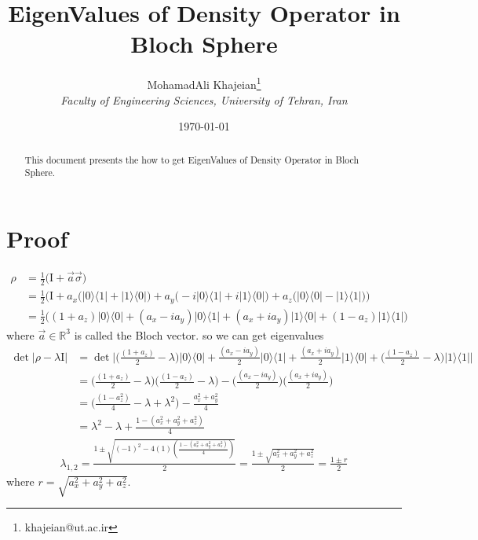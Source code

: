 \documentclass{article}
\title{\textbf{EigenValues of Density Operator in Bloch Sphere}}
\author{
    MohamadAli Khajeian\footnote{khajeian@ut.ac.ir} \\ 
    \small \textit{Faculty of Engineering Sciences, University of Tehran, Iran} \\ 
}
\date{\today}
\newcommand{\op}[2]{|#1\rangle \langle#2|}
\begin{document}
\maketitle

\begin{abstract}
    This document presents the how to get EigenValues of Density Operator in Bloch Sphere.
\end{abstract}

\section*{Proof}
\begin{align*}
    \rho &= \frac{1}{2}\big(\text{I} + \vec{a}\vec{\sigma}\big) \\
    &= \frac{1}{2}\bigg(\text{I} + a_{x}\big(\op{0}{1}+\op{1}{0}\big) + a_{y}\big(-i\op{0}{1}+i\op{1}{0}\big) + a_{z}\big(\op{0}{0}-\op{1}{1}\big)\bigg)\\
    &= \frac{1}{2}\bigg((1+a_{z})\op{0}{0}+(a_{x}-ia_{y})\op{0}{1}+(a_{x}+ia_{y})\op{1}{0}+(1-a_{z})\op{1}{1}\bigg)
\end{align*}
where ${\displaystyle {\vec {a}}\in \mathbb{R} ^{3}} $ is called the Bloch vector. so we can get eigenvalues
\begin{align*}
    \det |\rho - \lambda\text{I}| &= \det \bigg|\big(\frac{(1+a_{z})}{2}-\lambda\big)\op{0}{0}+\frac{(a_{x}-ia_{y})}{2}\op{0}{1}+\frac{(a_{x}+ia_{y})}{2}\op{1}{0}+\big(\frac{(1-a_{z})}{2}-\lambda\big)\op{1}{1}\bigg|\\
    &= \big(\frac{(1+a_{z})}{2}-\lambda\big)\big(\frac{(1-a_{z})}{2}-\lambda\big) - \big(\frac{(a_{x}-ia_{y})}{2}\big)\big(\frac{(a_{x}+ia_{y})}{2}\big) \\
    &= \big(\frac{(1-a^2_{z})}{4} - \lambda + \lambda^2\big) - \frac{a^2_{x} + a^2_{y}}{4} \\
    &= \lambda^2 - \lambda + \frac{1-(a^2_{x}+a^2_{y}+a^2_{z})}{4}
\end{align*}
\begin{align*}
   \lambda_{1,2} = \frac{1 \pm \sqrt{(-1)^2 - 4(1)(\displaystyle\frac{1-(a^2_{x}+a^2_{y}+a^2_{z})}{4})}}{2} = \frac{1 \pm \sqrt{a^2_{x}+a^2_{y}+a^2_{z}}}{2} = \frac{1 \pm r}{2}
\end{align*}
where $r=\sqrt{a^2_{x}+a^2_{y}+a^2_{z}}$.
\end{document}
